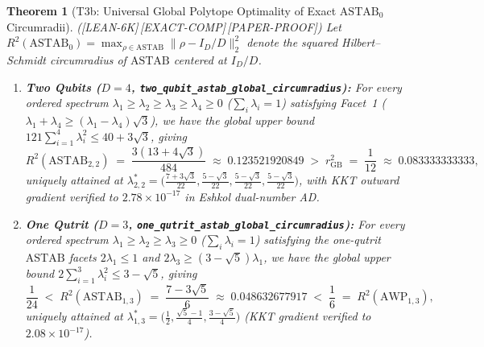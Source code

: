 \documentclass[11pt,reqno]{amsart}
\newtheorem{theorem}{Theorem}[section]
\theoremstyle{definition}
\newcommand{\ASTAB}{\mathrm{ASTAB}}
\newcommand{\AWP}{\mathrm{AWP}}
\newcommand{\lid}[1]{{\footnotesize\nolinkurl{#1}}}
\newcommand{\tagL}{\textsf{\footnotesize[LEAN-6K]}}
\newcommand{\tagE}{\textsf{\footnotesize[EXACT-COMP]}}
\newcommand{\tagP}{\textsf{\footnotesize[PAPER-PROOF]}}
\begin{document}
\begin{theorem}[T3b: Universal Global Polytope Optimality of Exact $\ASTAB_0$ Circumradii]
\label{thm:t3b}
\textup{(\tagL\,\tagE\,\tagP)}
Let $R^2(\ASTAB_0) = \max_{\rho \in \ASTAB} \|\rho - I_D/D\|_2^2$ denote the squared
Hilbert--Schmidt circumradius of $\ASTAB$ centered at $I_D/D$.
\begin{enumerate}[label=(\alph*)]
  \item \textbf{Two Qubits ($D=4$, \lid{two_qubit_astab_global_circumradius}):} For
    \emph{every} ordered spectrum $\lambda_1 \ge \lambda_2 \ge \lambda_3 \ge \lambda_4
    \ge 0$ ($\sum_i \lambda_i = 1$) satisfying Facet~1 ($\lambda_1 + \lambda_4 \ge
    (\lambda_1 - \lambda_4)\sqrt{3}$), we have the global upper bound
    $121\sum_{i=1}^4 \lambda_i^2 \le 40 + 3\sqrt{3}$, giving
    \[
      R^2(\ASTAB_{2,2}) \;=\; \frac{3(13 + 4\sqrt{3})}{484} \;\approx\; 0.123521920849
      \;>\; r_{\mathrm{GB}}^2 \;=\; \frac{1}{12} \;\approx\; 0.083333333333,
    \]
    uniquely attained at $\lambda^*_{2,2} = \big(\frac{7+3\sqrt{3}}{22},
    \frac{5-\sqrt{3}}{22}, \frac{5-\sqrt{3}}{22}, \frac{5-\sqrt{3}}{22}\big)$, with
    KKT outward gradient verified to $2.78 \times 10^{-17}$ in Eshkol dual-number AD.
  \item \textbf{One Qutrit ($D=3$, \lid{one_qutrit_astab_global_circumradius}):} For
    \emph{every} ordered spectrum $\lambda_1 \ge \lambda_2 \ge \lambda_3 \ge 0$
    ($\sum_i \lambda_i = 1$) satisfying the one-qutrit $\ASTAB$ facets $2\lambda_1 \le 1$
    and $2\lambda_3 \ge (3-\sqrt{5})\lambda_1$, we have the global upper bound
    $2\sum_{i=1}^3 \lambda_i^2 \le 3 - \sqrt{5}$, giving
    \[
      \frac{1}{24} \;<\; R^2(\ASTAB_{1,3}) \;=\; \frac{7 - 3\sqrt{5}}{6} \;\approx\; 0.048632677917
      \;<\; \frac{1}{6} \;=\; R^2(\AWP_{1,3}),
    \]
    uniquely attained at $\lambda^*_{1,3} = \big(\frac{1}{2}, \frac{\sqrt{5}-1}{4},
    \frac{3-\sqrt{5}}{4}\big)$ (KKT gradient verified to $2.08 \times 10^{-17}$).
\end{enumerate}
\end{theorem}
\end{document}
